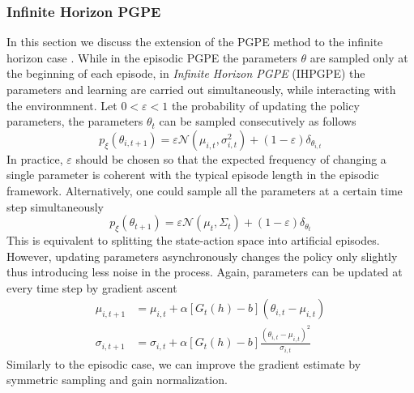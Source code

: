 \subsubsection{Infinite Horizon PGPE}
In this section we discuss the extension of the PGPE method to the infinite
horizon case \cite{sehnke2012parameter}. While in the episodic PGPE the
parameters $\theta$ are sampled only at the beginning of each episode, in
\emph{Infinite Horizon PGPE} (IHPGPE) the parameters and learning are carried 
out simultaneously, while interacting with the environmnent. Let $0 <
\varepsilon < 1$ the probability of updating the policy parameters, the 
parameters $\theta_t$ can be sampled consecutively as follows
\begin{equation}
	p_\xi(\theta_{i,t+1}) = \varepsilon \mathcal{N}(\mu_{i,t}, \sigma_{i,t}^2) 
							+ (1-\varepsilon) \delta_{\theta_{i,t}}
\end{equation}
In practice, $\varepsilon$ should be chosen so that the expected frequency of
changing a single parameter is coherent with the typical episode length in the
episodic framework. Alternatively, one could sample all the parameters at a
certain time step simultaneously
\begin{equation}
	p_\xi(\theta_{t+1}) = \varepsilon \mathcal{N}(\mu_{t}, \Sigma_t) 
							+ (1-\varepsilon) \delta_{\theta_{t}}
\end{equation}
This is equivalent to splitting the state-action space into artificial
episodes. However, updating parameters asynchronously changes the policy only
slightly thus introducing less noise in the process. Again, parameters can be
updated at every time step by gradient ascent
\begin{equation}
	\begin{split}
		\mu_{i,t+1} &= \mu_{i,t} + \alpha \left[G_t(h) - b\right] (\theta_{i,t}
		- \mu_{i,t})\\
		\sigma_{i,t+1} &= \sigma_{i,t} + \alpha \left[G_t(h) - b\right] 
		\frac{(\theta_{i,t} -\mu_{i,t})^2}{\sigma_{i,t}}
	\end{split}
\end{equation}
Similarly to the episodic case, we can improve the gradient estimate by
symmetric sampling and gain normalization. 


